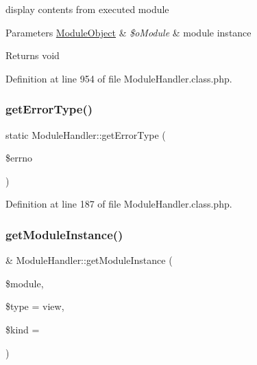 display contents from executed module 
\begin{DoxyParams}[1]{Parameters}
\hyperlink{classModuleObject}{Module\+Object} & {\em \$o\+Module} & module instance \\
\hline
\end{DoxyParams}
\begin{DoxyReturn}{Returns}
void 
\end{DoxyReturn}


Definition at line 954 of file Module\+Handler.\+class.\+php.

\mbox{\label{classModuleHandler_a140184b247fc515e6f49eb87ff59ae74}} 
\subsubsection{\texorpdfstring{get\+Error\+Type()}{getErrorType()}}
{\footnotesize\ttfamily static Module\+Handler\+::get\+Error\+Type (\begin{DoxyParamCaption}\item[{}]{\$errno }\end{DoxyParamCaption})\hspace{0.3cm}{\ttfamily [static]}}



Definition at line 187 of file Module\+Handler.\+class.\+php.

\mbox{\label{classModuleHandler_a453924aa8565875e953bfc9b8870fabb}} 
\subsubsection{\texorpdfstring{get\+Module\+Instance()}{getModuleInstance()}}
{\footnotesize\ttfamily \& Module\+Handler\+::get\+Module\+Instance (\begin{DoxyParamCaption}\item[{}]{\$module,  }\item[{}]{\$type = {\ttfamily \textquotesingle{}view\textquotesingle{}},  }\item[{}]{\$kind = {\ttfamily \textquotesingle{}\textquotesingle{}} }\end{DoxyParamCaption})}

